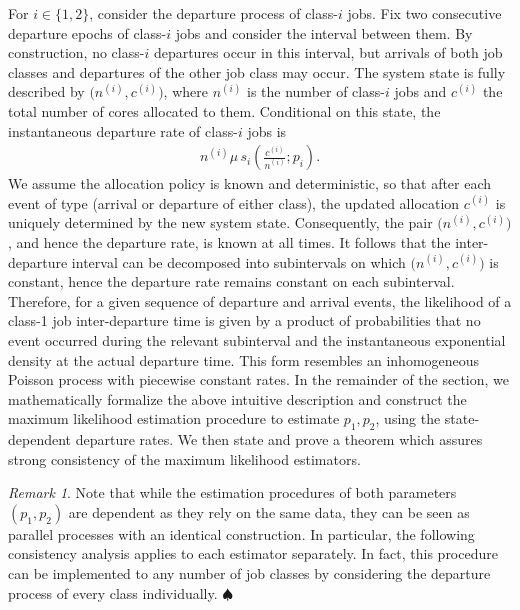 \documentclass[11pt]{article}
\theoremstyle{remark}
\newtheorem{remark}[thm]{Remark}
\theoremstyle{definition}
\numberwithin{equation}{section}
\begin{document}
For $i \in \{1, 2\}$, consider the departure process of class-$i$ jobs.
Fix two consecutive departure epochs of class-$i$ jobs and consider the interval between them. By construction, no class-$i$ departures occur in this interval, but arrivals of both job classes and departures of the other job class may occur.
The system state is fully described by $\big(n^{(i)},c^{(i)}\big)$, where $n^{(i)}$ is the number of class-$i$ jobs and $c^{(i)}$ the total number of cores allocated to them. Conditional on this state, the instantaneous departure rate of class-$i$ jobs is
\begin{align*}
n^{(i)} \mu\, s_i\left(\frac{c^{(i)}}{n^{(i)}}; p_i\right).
\end{align*}
We assume the allocation policy is known and deterministic, so that after each event of type (arrival or departure of either class), the updated allocation $c^{(i)}$ is uniquely determined by the new system state. Consequently, the pair $\big(n^{(i)},c^{(i)}\big)$, and hence the departure rate, is known at all times. 
It follows that the inter-departure interval can be decomposed into subintervals on which $\big(n^{(i)},c^{(i)}\big)$ is constant, hence the departure rate remains constant on each subinterval. 
Therefore, for a given sequence of departure and arrival events, the likelihood of a class-1 job inter-departure time is given by a product of probabilities that no event occurred during the relevant subinterval and the instantaneous exponential density at the actual departure time. 
This form resembles an inhomogeneous Poisson process with piecewise constant rates.
In the remainder of the section, we mathematically formalize the above intuitive description and construct the maximum likelihood estimation procedure to estimate $p_1, p_2$, using the state-dependent departure rates. We then state and prove a theorem which assures strong consistency of the maximum likelihood estimators.

\begin{remark}\label{rem:dep_estimators}
     Note that while the estimation procedures of both parameters $(p_1,p_2)$ are dependent as they rely on the same data, they can be seen as parallel processes with an identical construction. In particular, the following consistency analysis applies to each estimator separately. In fact, this procedure can be  implemented to any number of job classes by considering the departure process of every class individually. \hfill $\spadesuit$
\end{remark}
\end{document}
